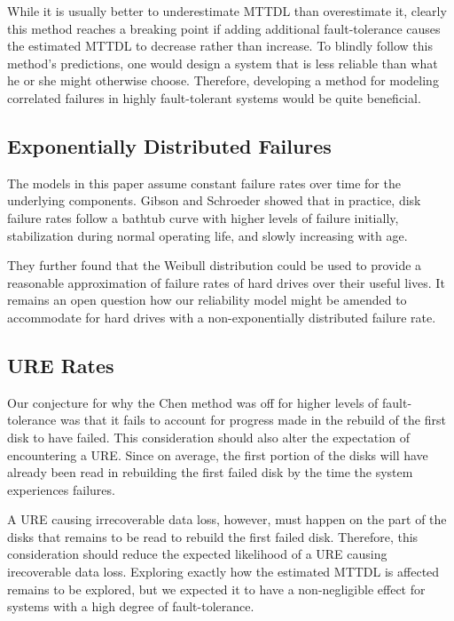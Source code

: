 \documentclass[XXX,endnotes]{usetex-v1}
\begin{document}
While it is usually better to underestimate MTTDL than overestimate it, clearly this method reaches a breaking point if adding additional fault-tolerance causes the estimated MTTDL to decrease rather than increase.  To blindly follow this method's predictions, one would design a system that is less reliable than what he or she might otherwise choose.  Therefore, developing a method for modeling correlated failures in highly fault-tolerant systems would be quite beneficial.

\subsection{Exponentially Distributed Failures}

The models in this paper assume constant failure rates over time for the underlying components.  Gibson and Schroeder showed that in practice, disk failure rates follow a bathtub curve\cite{weibull} with higher levels of failure initially, stabilization during normal operating life, and slowly increasing with age.

They further found that the Weibull distribution could be used to provide a reasonable approximation of failure rates of hard drives over their useful lives.  It remains an open question how our reliability model might be amended to accommodate for hard drives with a non-exponentially distributed failure rate.

\subsection{URE Rates}

Our conjecture for why the Chen method was off for higher levels of fault-tolerance was that it fails to account for progress made in the rebuild of the first disk to have failed.  This consideration should also alter the expectation of encountering a URE.  Since on average, the first  portion of the disks will have already been read in rebuilding the first failed disk by the time the system experiences  failures.

A URE causing irrecoverable data loss, however, must happen on the part of the disks that remains to be read to rebuild the first failed disk.  Therefore, this consideration should reduce the expected likelihood of a URE causing irecoverable data loss.  Exploring exactly how the estimated MTTDL is affected remains to be explored, but we expected it to have a non-negligible effect for systems with a high degree of fault-tolerance.
\end{document}
